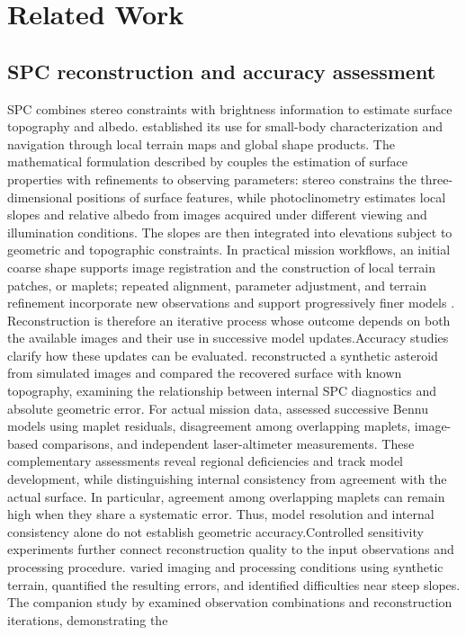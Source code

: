 \section{Related Work}
\label{sec:related-work}

\subsection{SPC reconstruction and accuracy assessment}
\label{subsec:spc-reconstruction-accuracy}





SPC combines stereo constraints with brightness information to estimate surface topography and albedo. \citet{gaskell2008} established its use for small-body characterization and navigation through local terrain maps and global shape products. The mathematical formulation described by \citet{gaskell2023} couples the estimation of surface properties with refinements to observing parameters: stereo constrains the three-dimensional positions of surface features, while photoclinometry estimates local slopes and relative albedo from images acquired under different viewing and illumination conditions. The slopes are then integrated into elevations subject to geometric and topographic constraints. In practical mission workflows, an initial coarse shape supports image registration and the construction of local terrain patches, or maplets; repeated alignment, parameter adjustment, and terrain refinement incorporate new observations and support progressively finer models \citep{barnouin2020,palmer2022}. Reconstruction is therefore an iterative process whose outcome depends on both the available images and their use in successive model updates.Accuracy studies clarify how these updates can be evaluated. \citet{weirich2022} reconstructed a synthetic asteroid from simulated images and compared the recovered surface with known topography, examining the relationship between internal SPC diagnostics and absolute geometric error. For actual mission data, \citet{alasad2021} assessed successive Bennu models using maplet residuals, disagreement among overlapping maplets, image-based comparisons, and independent laser-altimeter measurements. These complementary assessments reveal regional deficiencies and track model development, while distinguishing internal consistency from agreement with the actual surface. In particular, agreement among overlapping maplets can remain high when they share a systematic error. Thus, model resolution and internal consistency alone do not establish geometric accuracy.Controlled sensitivity experiments further connect reconstruction quality to the input observations and processing procedure. \citet{palmer2024accuracy} varied imaging and processing conditions using synthetic terrain, quantified the resulting errors, and identified difficulties near steep slopes. The companion study by \citet{palmer2024geometry} examined observation combinations and reconstruction iterations, demonstrating the 